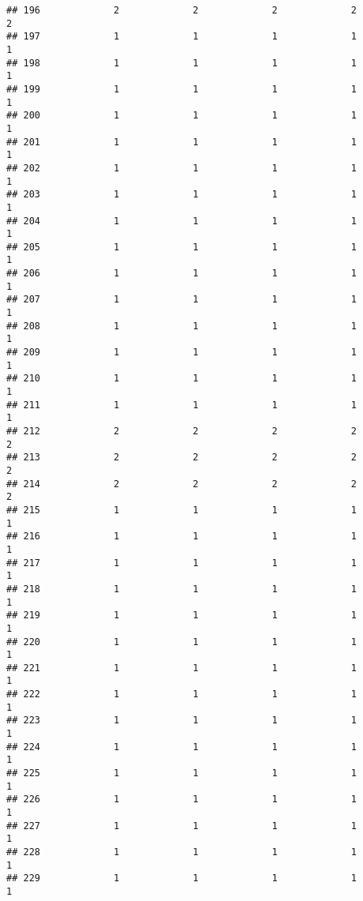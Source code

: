 \documentclass[
]{article}
\begin{document}
\begin{verbatim}
## 196             2             2             2             2             2
## 197             1             1             1             1             1
## 198             1             1             1             1             1
## 199             1             1             1             1             1
## 200             1             1             1             1             1
## 201             1             1             1             1             1
## 202             1             1             1             1             1
## 203             1             1             1             1             1
## 204             1             1             1             1             1
## 205             1             1             1             1             1
## 206             1             1             1             1             1
## 207             1             1             1             1             1
## 208             1             1             1             1             1
## 209             1             1             1             1             1
## 210             1             1             1             1             1
## 211             1             1             1             1             1
## 212             2             2             2             2             2
## 213             2             2             2             2             2
## 214             2             2             2             2             2
## 215             1             1             1             1             1
## 216             1             1             1             1             1
## 217             1             1             1             1             1
## 218             1             1             1             1             1
## 219             1             1             1             1             1
## 220             1             1             1             1             1
## 221             1             1             1             1             1
## 222             1             1             1             1             1
## 223             1             1             1             1             1
## 224             1             1             1             1             1
## 225             1             1             1             1             1
## 226             1             1             1             1             1
## 227             1             1             1             1             1
## 228             1             1             1             1             1
## 229             1             1             1             1             1

\end{verbatim}
\end{document}
